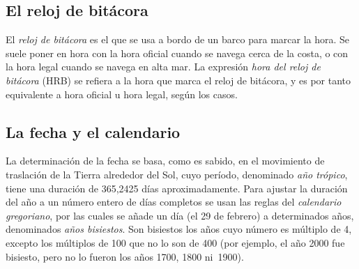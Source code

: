 \subsection{El reloj de bitácora}


El \emph{reloj de bitácora} es el que se usa a bordo de un barco para marcar la hora. Se suele poner en hora con la hora oficial cuando se navega cerca de la costa, o con la hora legal cuando se navega en alta mar. La expresión \emph{hora del reloj de bitácora} (HRB) se refiera a la hora que marca el reloj de bitácora, y es por tanto equivalente a hora oficial u hora legal, según los casos. 

\subsection{La fecha y el calendario}


La determinación de la fecha se basa, como es sabido, en el movimiento de traslación de la Tierra alrededor del Sol, cuyo período, denominado \emph{año trópico}, tiene una duración de 365,2425 días aproximadamente. Para ajustar la duración del año a un número entero de días completos se usan las reglas del \emph{calendario gregoriano}, por las cuales se añade un día (el 29 de febrero) a determinados años, denominados \emph{años bisiestos}. Son bisiestos los años cuyo número es múltiplo de 4, excepto los múltiplos de 100 que no lo son de 400 (por ejemplo, el año 2000 fue bisiesto, pero no lo fueron los años 1700, 1800 ni~1900).
